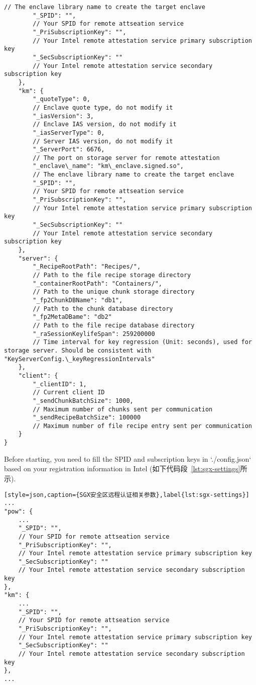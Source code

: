 \begin{lstlisting}[style=json,caption={\sysnameS 原型系统运行参数},label={lst:sgxdedup--config}]
        // The enclave library name to create the target enclave
        "_SPID": "", 
        // Your SPID for remote attseation service
        "_PriSubscriptionKey": "", 
        // Your Intel remote attestation service primary subscription key
        "_SecSubscriptionKey": "" 
        // Your Intel remote attestation service secondary subscription key
    },
    "km": {
        "_quoteType": 0, 
        // Enclave quote type, do not modify it 
        "_iasVersion": 3, 
        // Enclave IAS version, do not modify it 
        "_iasServerType": 0, 
        // Server IAS version, do not modify it
        "_ServerPort": 6676, 
        // The port on storage server for remote attestation
        "_enclave\_name": "km\_enclave.signed.so", 
        // The enclave library name to create the target enclave
        "_SPID": "", 
        // Your SPID for remote attseation service
        "_PriSubscriptionKey": "", 
        // Your Intel remote attestation service primary subscription key
        "_SecSubscriptionKey": "" 
        // Your Intel remote attestation service secondary subscription key
    },
    "server": {
        "_RecipeRootPath": "Recipes/", 
        // Path to the file recipe storage directory
        "_containerRootPath": "Containers/", 
        // Path to the unique chunk storage directory
        "_fp2ChunkDBName": "db1", 
        // Path to the chunk database directory
        "_fp2MetaDBame": "db2" 
        // Path to the file recipe database directory
        "_raSessionKeylifeSpan": 259200000 
        // Time interval for key regression (Unit: seconds), used for storage server. Should be consistent with "KeyServerConfig.\_keyRegressionIntervals"
    },
    "client": {
        "_clientID": 1, 
        // Current client ID 
        "_sendChunkBatchSize": 1000, 
        // Maximum number of chunks sent per communication
        "_sendRecipeBatchSize": 100000 
        // Maximum number of file recipe entry sent per communication
    }
}
\end{lstlisting}

Before starting, you need to fill the SPID and subscription keys in `./config.json` based on your registration information in Intel (如下代码段~\ref{lst:sgx-settings}所示).

\begin{lstlisting}[style=json,caption={SGX安全区远程认证相关参数},label{lst:sgx-settings}]
...
"pow": {
    ...
    "_SPID": "", 
    // Your SPID for remote attseation service
    "_PriSubscriptionKey": "", 
    // Your Intel remote attestation service primary subscription key
    "_SecSubscriptionKey": "" 
    // Your Intel remote attestation service secondary subscription key
},
"km": {
    ...
    "_SPID": "", 
    // Your SPID for remote attseation service
    "_PriSubscriptionKey": "", 
    // Your Intel remote attestation service primary subscription key
    "_SecSubscriptionKey": "" 
    // Your Intel remote attestation service secondary subscription key
},
...
\end{lstlisting}

